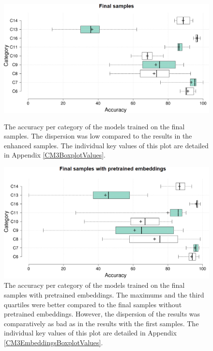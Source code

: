 \begin{figure}[]
 \begin{minipage}[t]{\textwidth}
    \centering
    \includegraphics[width =\textwidth]{Images/CM3Boxplot.png}
    \caption{The accuracy per category of the models trained on the final samples. The dispersion was low compared to the results in the enhanced samples. The individual key values of this plot are detailed in Appendix \ref{CM3BoxplotValues}.}
    \label{CM3Boxplot}
\end{minipage}

 \begin{minipage}[b]{\textwidth}
    \centering
    \includegraphics[width =\textwidth]{Images/CM3EmbeddingsBoxplot.png}
    \caption{The accuracy per category of the models trained on the final samples with pretrained embeddings. The maximums and the third quartiles were better compared to the final samples without pretrained embeddings. However, the dispersion of the results was comparatively as bad as in the results with the first samples. The individual key values of this plot are detailed in Appendix \ref{CM3EmbeddingsBoxplotValues}.}
    \label{CM3EmbeddingsBoxplot}
\end{minipage}
\end{figure} \hfill

